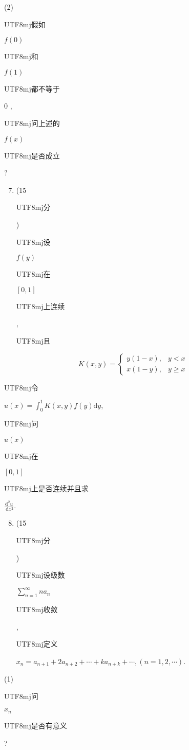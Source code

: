 \documentclass[10pt]{article}
\begin{document}
(2) \begin{CJK}{UTF8}{mj}假如\end{CJK} $f(0)$ \begin{CJK}{UTF8}{mj}和\end{CJK} $f(1)$ \begin{CJK}{UTF8}{mj}都不等于\end{CJK} 0 , \begin{CJK}{UTF8}{mj}问上述的\end{CJK} $f(x)$ \begin{CJK}{UTF8}{mj}是否成立\end{CJK}?

\begin{enumerate}
  \setcounter{enumi}{6}
  \item (15 \begin{CJK}{UTF8}{mj}分\end{CJK}) \begin{CJK}{UTF8}{mj}设\end{CJK} $f(y)$ \begin{CJK}{UTF8}{mj}在\end{CJK} $[0,1]$ \begin{CJK}{UTF8}{mj}上连续\end{CJK}, \begin{CJK}{UTF8}{mj}且\end{CJK}
\end{enumerate}
$$
K(x, y)= \begin{cases}y(1-x), & y<x \\ x(1-y), & y \geqslant x\end{cases}
$$
\begin{CJK}{UTF8}{mj}令\end{CJK} $u(x)=\int_{0}^{1} K(x, y) f(y) \mathrm{d} y$, \begin{CJK}{UTF8}{mj}问\end{CJK} $u(x)$ \begin{CJK}{UTF8}{mj}在\end{CJK} $[0,1]$ \begin{CJK}{UTF8}{mj}上是否连续并且求\end{CJK} $\frac{\mathrm{d}^{2} u}{\mathrm{~d} x^{2}}$.

\begin{enumerate}
  \setcounter{enumi}{7}
  \item (15 \begin{CJK}{UTF8}{mj}分\end{CJK}) \begin{CJK}{UTF8}{mj}设级数\end{CJK} $\sum_{n=1}^{\infty} n a_{n}$ \begin{CJK}{UTF8}{mj}收敛\end{CJK}, \begin{CJK}{UTF8}{mj}定义\end{CJK} $x_{n}=a_{n+1}+2 a_{n+2}+\cdots+k a_{n+k}+\cdots,(n=1,2, \cdots)$.
\end{enumerate}
(1) \begin{CJK}{UTF8}{mj}问\end{CJK} $x_{n}$ \begin{CJK}{UTF8}{mj}是否有意义\end{CJK}?
\end{document}
